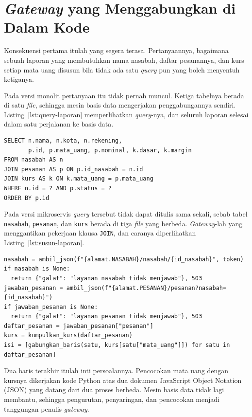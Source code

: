 \section{\textit{Gateway} yang Menggabungkan di Dalam Kode}

Konsekuensi pertama itulah yang segera terasa. Pertanyaannya, bagaimana sebuah
laporan yang membutuhkan nama nasabah, daftar pesanannya, dan kurs setiap mata
uang disusun bila tidak ada satu \textit{query} pun yang boleh menyentuh ketiganya.

Pada versi monolit pertanyaan itu tidak pernah muncul. Ketiga tabelnya berada
di satu \textit{file}, sehingga mesin basis data mengerjakan penggabungannya sendiri.
Listing~\ref{lst:query-laporan} memperlihatkan \textit{query}-nya, dan seluruh laporan
selesai dalam satu perjalanan ke basis data.

\begin{lstlisting}[style=SqlStyle, caption={Penggabungan lewat SQL pada versi
  monolit, tersedia di \berkas{sources/chapter13/monolit.py}},
  label=lst:query-laporan]
SELECT n.nama, n.kota, n.rekening,
       p.id, p.mata_uang, p.nominal, k.dasar, k.margin
FROM nasabah AS n
JOIN pesanan AS p ON p.id_nasabah = n.id
JOIN kurs AS k ON k.mata_uang = p.mata_uang
WHERE n.id = ? AND p.status = ?
ORDER BY p.id
\end{lstlisting}

Pada versi mikroservis \textit{query} tersebut tidak dapat ditulis sama sekali, sebab
tabel \texttt{nasabah}, \texttt{pesanan}, dan \texttt{kurs} berada di tiga
\textit{file} yang berbeda. \textit{Gateway}-lah yang menggantikan pekerjaan klausa
\texttt{JOIN}, dan caranya diperlihatkan Listing~\ref{lst:susun-laporan}.

\begin{lstlisting}[style=PythonStyle, caption={Penggabungan di dalam kode pada
  versi mikroservis, tersedia di \berkas{sources/chapter13/gerbang.py}},
  label=lst:susun-laporan]
nasabah = ambil_json(f"{alamat.NASABAH}/nasabah/{id_nasabah}", token)
if nasabah is None:
  return {"galat": "layanan nasabah tidak menjawab"}, 503
jawaban_pesanan = ambil_json(f"{alamat.PESANAN}/pesanan?nasabah={id_nasabah}")
if jawaban_pesanan is None:
  return {"galat": "layanan pesanan tidak menjawab"}, 503
daftar_pesanan = jawaban_pesanan["pesanan"]
kurs = kumpulkan_kurs(daftar_pesanan)
isi = [gabungkan_baris(satu, kurs[satu["mata_uang"]]) for satu in daftar_pesanan]
\end{lstlisting}

Dua baris terakhir itulah inti persoalannya. Pencocokan mata uang dengan kursnya
dikerjakan kode Python atas dua dokumen JavaScript Object Notation (JSON) yang
datang dari dua proses berbeda. Mesin basis data tidak lagi membantu, sehingga
pengurutan, penyaringan, dan pencocokan menjadi tanggungan penulis \textit{gateway}.

